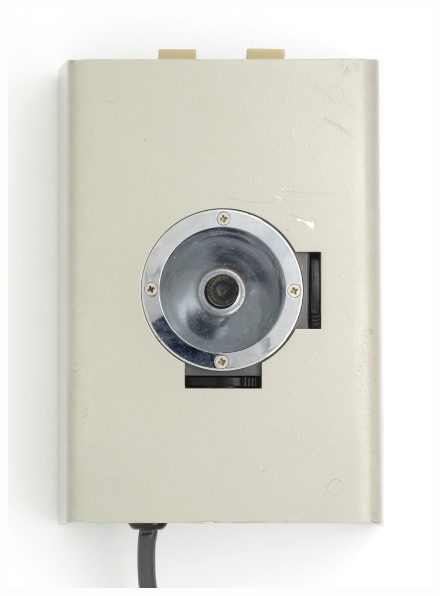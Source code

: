 \documentclass[11pt, a4paper]{article}
\begin{document}
\begin{figure}[h]
    \centering
    \includegraphics[scale=0.55]{1975_Tektronix_4952_Joystick/top_30.jpg}

\end{figure}
\end{document}
